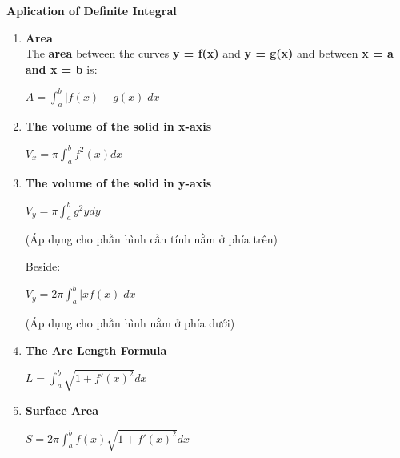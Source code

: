 \documentclass[10pt]{article}
\begin{document}
\pagebreak
\begin{center}
\textbf{Aplication of Definite Integral}
\end{center}
\begin{enumerate}
	\item \textbf{Area}\\
	The \textbf{area} between the curves \textbf{y = f(x)} and \textbf{y = g(x)} and between \textbf{x = a and x = b} is:
	\begin{mybox}
	\begin{center}
	$A = \displaystyle \int_{a}^{b} |f(x) - g(x)|dx$
	\end{center}
	\end{mybox}
	\item \textbf{The volume of the solid in x-axis}
	\begin{mybox}
	\begin{center}
	$V_x = \pi \displaystyle \int_{a}^{b}f^2(x)dx$
	\end{center}
	\end{mybox}
	\item \textbf{The volume of the solid in y-axis}
	\begin{mybox}
	\begin{center}
	$V_y = \pi \displaystyle \int_{a}^{b}g^2ydy$
	\end{center}
	\end{mybox}
	\begin{center}
	(Áp dụng cho phần hình cần tính nằm ở phía trên)
	\end{center}
	Beside:
	\begin{mybox}
	\begin{center}
	$V_y = 2 \pi \displaystyle \int_{a}^{b} |xf(x)|dx$
	\end{center}
	\end{mybox}
	\begin{center}
	(Áp dụng cho phần hình nằm ở phía dưới)
	\end{center}
	\item \textbf{The Arc Length Formula}
	\begin{mybox}
	\begin{center}
	$L = \displaystyle \int_{a}^{b} \sqrt{1 + f'(x)^2}dx$
	\end{center}
	\end{mybox}
	\item \textbf{Surface Area}
	\begin{mybox}
	\begin{center}
	$S = 2 \pi \displaystyle \int_{a}^{b} f(x) \sqrt{1 + f'(x)^2}dx$
	\end{center}
	\end{mybox}
\end{enumerate}
\end{document}
